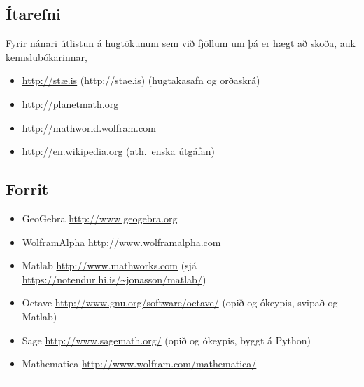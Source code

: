 \documentclass[a4paper,10pt,icelandic]{sphinxmanual}
\begin{document}


\subsection{Ítarefni}
\label{kafli01:itarefni}
Fyrir nánari útlistun á hugtökunum sem við fjöllum um þá er hægt að skoða,
auk kennslubókarinnar,
\begin{itemize}
\item {} 
\href{http://stae.is}{http://stæ.is} (http://stae.is) (hugtakasafn og orðaskrá)

\item {} 
\url{http://planetmath.org}

\item {} 
\url{http://mathworld.wolfram.com}

\item {} 
\url{http://en.wikipedia.org} (ath. enska útgáfan)

\end{itemize}


\subsection{Forrit}
\label{kafli01:forrit}\begin{itemize}
\item {} 
GeoGebra \url{http://www.geogebra.org}

\item {} 
WolframAlpha \url{http://www.wolframalpha.com}

\item {} 
Matlab \url{http://www.mathworks.com}
(sjá \url{https://notendur.hi.is/~jonasson/matlab/})

\item {} 
Octave \url{http://www.gnu.org/software/octave/} (opið og ókeypis, svipað og Matlab)

\item {} 
Sage \url{http://www.sagemath.org/}  (opið og ókeypis, byggt á Python)

\item {} 
Mathematica \url{http://www.wolfram.com/mathematica/}

\end{itemize}


\bigskip\hrule{}\bigskip
\end{document}
